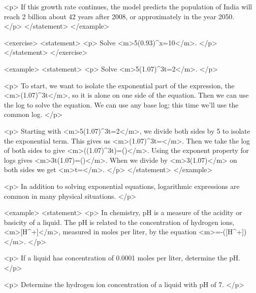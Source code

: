                 <p>
                    If this growth rate continues, the model predicts the population of India will reach 2 billion about 42 years after 2008, or approximately in the year 2050.
                </p>
            </statement>
        </example>

        <exercise>
            <statement>
                <p>
                    Solve <m>5(0.93)^{x}=10</m>.
                </p>
            </statement>
        </exercise>

        <example>
            <statement>
                <p>
                    Solve <m>5(1.07)^{3t}=2</m>.
                </p>

                <p>
                    To start, we want to isolate the exponential part of the expression, the <m>(1.07)^{3t}</m>, so it is alone on one side of the equation.
                    Then we can use the log to solve the equation.
                    We can use any base log; this time we’ll use the common log.
                </p>

                <p>
                    Starting with <m>5(1.07)^{3t}=2</m>, we divide both sides by 5 to isolate the exponential term.
                    This gives us <m>(1.07)^{3t}=</m>.
                    Then we take the log of both sides to give <m>\log⁡((1.07)^{3t})=\log⁡()</m>.
                    Using the exponent property for logs gives <m>3t\log⁡(1.07)=\log⁡()</m>.
                    When we divide by <m>3\log⁡(1.07)</m> on both sides we get <m>t=</m>.
                </p>
            </statement>
        </example>

        <p>
            In addition to solving exponential equations, logarithmic expressions are common in many physical situations.
        </p>

        <example>
            <statement>
                <p>
                    In chemistry, pH is a measure of the acidity or basicity of a liquid.
                    The pH is related to the concentration of hydrogen ions, <m>[H^{+}]</m>, measured in moles per liter, by the equation <m>=-\log⁡([H^{+}])</m>.
                </p>

                <p>
                    If a liquid has concentration of 0.0001 moles per liter, determine the pH.
                </p>

                <p>
                    Determine the hydrogen ion concentration of a liquid with pH of 7.
                </p>

